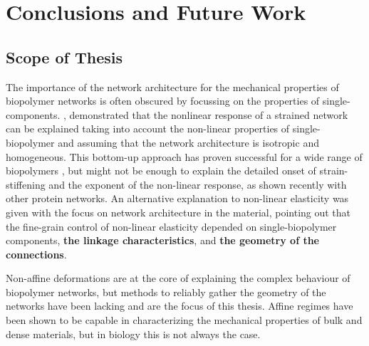 \chapter{Conclusions and Future Work}
\label{Chapter-Conclusions}

\section{Scope of Thesis}%
\label{sec:scope_of_thesis}

The importance of the network architecture for the mechanical properties of biopolymer networks is often obscured by focussing on the properties of single-components. \cite{storm_nonlinear_2005}, demonstrated that the nonlinear response of a strained network can be explained taking into account the non-linear properties of single-biopolymer and assuming that the network architecture is isotropic and homogeneous. This bottom-up approach has proven successful for a wide range of biopolymers \cite{carrillo_nonlinear_2013}, but might not be enough to explain the detailed onset of strain-stiffening and the exponent of the non-linear response, as shown recently with other protein networks\cite{licup_stress_2015}. An alternative explanation to non-linear elasticity was given with the focus on network architecture in the material\cite{onck_alternative_2005}, pointing out that the fine-grain control of non-linear elasticity depended on single-biopolymer components, \textbf{the linkage characteristics}, and \textbf{the geometry of the connections}.


Non-affine deformations are at the core of explaining the complex behaviour of biopolymer networks, but methods to reliably gather the geometry of the networks have been lacking and are the focus of this thesis. Affine regimes have been shown to be capable in characterizing the mechanical properties of bulk and dense materials, but in biology this is not always the case.

